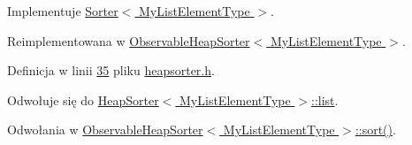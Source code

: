 Implementuje \hyperlink{class_sorter_a4a82d8151d6172802d1e60cb30c7d7d3}{Sorter$<$ My\-List\-Element\-Type $>$}.



Reimplementowana w \hyperlink{class_observable_heap_sorter_a5e92d70e5a769ba7249f974a48b94bd0}{Observable\-Heap\-Sorter$<$ My\-List\-Element\-Type $>$}.



Definicja w linii \hyperlink{heapsorter_8h_source_l00035}{35} pliku \hyperlink{heapsorter_8h_source}{heapsorter.\-h}.



Odwołuje się do \hyperlink{heapsorter_8h_source_l00019}{Heap\-Sorter$<$ My\-List\-Element\-Type $>$\-::list}.



Odwołania w \hyperlink{observableheapsorter_8h_source_l00023}{Observable\-Heap\-Sorter$<$ My\-List\-Element\-Type $>$\-::sort()}.


